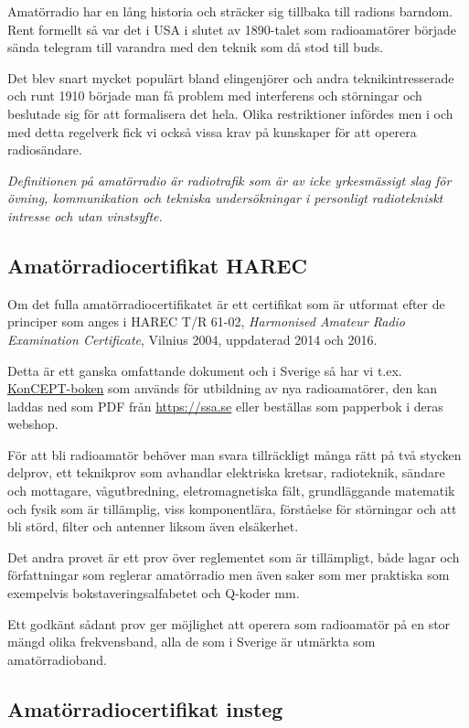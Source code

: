 Amatörradio har en lång historia och sträcker sig tillbaka till radions
barndom. Rent formellt så var det i USA i slutet av 1890-talet som
radioamatörer började sända telegram till varandra med den teknik som då stod
till buds.

Det blev snart mycket populärt bland elingenjörer och andra teknikintresserade
och runt 1910 började man få problem med interferens och störningar och
beslutade sig för att formalisera det hela. Olika restriktioner infördes men i
och med detta regelverk fick vi också vissa krav på kunskaper för att operera
radiosändare.

{\it Definitionen på amatörradio är radiotrafik som är av icke yrkesmässigt slag för
övning, kommunikation och tekniska undersökningar i personligt radiotekniskt
intresse och utan vinstsyfte. }

\subsection{Amatörradiocertifikat HAREC}

Om det fulla amatörradiocertifikatet är ett certifikat som är utformat efter
de principer som anges i HAREC T/R 61-02, {\it Harmonised Amateur Radio
  Examination Certificate}, Vilnius 2004, uppdaterad 2014 och 2016.

Detta är ett ganska omfattande dokument och i Sverige så har vi t.ex.
\href{https://github.com/SverigesSandareamatorer/SSA-Akademin}{KonCEPT-boken}
som används för utbildning av nya radioamatörer, den kan laddas ned som PDF
från \url{https://ssa.se} eller beställas som papperbok i deras webshop.

För att bli radioamatör behöver man svara tillräckligt många rätt på två
stycken delprov, ett teknikprov som avhandlar elektriska kretsar, radioteknik,
sändare och mottagare, vågutbredning, eletromagnetiska fält, grundläggande
matematik och fysik som är tillämplig, viss komponentlära, förståelse för
störningar och att bli störd, filter och antenner liksom även elsäkerhet.

Det andra provet är ett prov över reglementet som är tillämpligt, både lagar
och författningar som reglerar amatörradio men även saker som mer praktiska
som exempelvis bokstaveringsalfabetet och Q-koder mm.

Ett godkänt sådant prov ger möjlighet att operera som radioamatör på en stor
mängd olika frekvensband, alla de som i Sverige är utmärkta som
amatörradioband.

\subsection{Amatörradiocertifikat insteg}
\label{sec:instegscertifikat}

